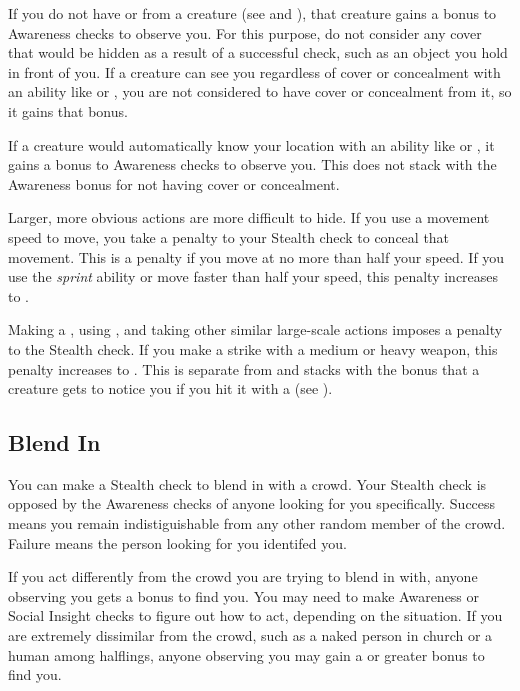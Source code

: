         If you do not have  or  from a creature (see  and ), that creature gains a  bonus to Awareness checks to observe you.
        For this purpose, do not consider any cover that would be hidden as a result of a successful check, such as an object you hold in front of you.
        If a creature can see you regardless of cover or concealment with an ability like  or , you are not considered to have cover or concealment from it, so it gains that  bonus.

        If a creature would automatically know your location with an ability like  or , it gains a  bonus to Awareness checks to observe you.
        This does not stack with the Awareness bonus for not having cover or concealment.

        Larger, more obvious actions are more difficult to hide.
        If you use a movement speed to move, you take a penalty to your Stealth check to conceal that movement.
        This is a  penalty if you move at no more than half your speed.
        If you use the \textit{sprint} ability or move faster than half your speed, this penalty increases to .

        Making a , using , and taking other similar large-scale actions imposes a  penalty to the Stealth check.
        If you make a strike with a medium or heavy weapon, this penalty increases to .
        This is separate from and stacks with the  bonus that a creature gets to notice you if you hit it with a  (see ).

    \subsection{Blend In}
        You can make a Stealth check to blend in with a crowd. Your Stealth check is opposed by the Awareness checks of anyone looking for you specifically. Success means you remain indistiguishable from any other random member of the crowd. Failure means the person looking for you identifed you.

        If you act differently from the crowd you are trying to blend in with, anyone observing you gets a  bonus to find you. You may need to make Awareness or Social Insight checks to figure out how to act, depending on the situation. If you are extremely dissimilar from the crowd, such as a naked person in church or a human among halflings, anyone observing you may gain a  or greater bonus to find you.

